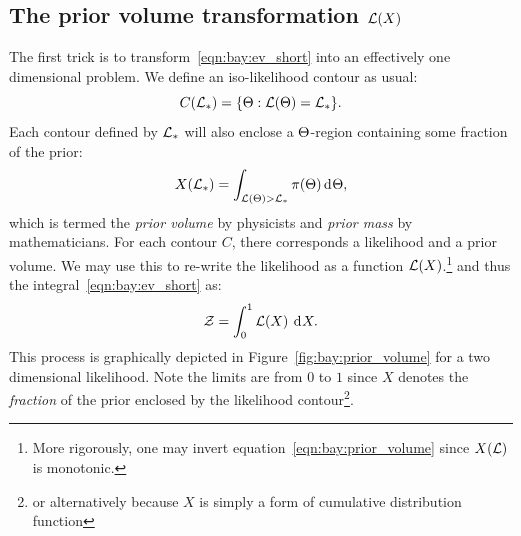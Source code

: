 \subsection{The prior volume transformation $\mathcal{L}(X)$}
The first trick is to transform~\eqref{eqn:bay:ev_short} into an effectively one dimensional problem. We define an iso-likelihood contour as usual:
\begin{equation}
  C(\mathcal{L}_\ast) = \{\Theta : \mathcal{L}(\Theta)=\mathcal{L}_\ast \}.
  \label{eqn:bay:contour_def}
\end{equation}
Each contour defined by $\mathcal{L}_\ast$ will also enclose a $\Theta$-region containing some fraction of the prior:
\begin{equation}
  X(\mathcal{L}_\ast) = \int_{\mathcal{L}(\Theta)>\mathcal{L}_\ast} \pi(\Theta) \operatorname{d}^{}\!{\Theta},
  \label{eqn:bay:prior_volume}
\end{equation}
which is termed the {\em prior volume\/} by physicists and {\em prior mass\/} by mathematicians. For each contour $C$, there corresponds a likelihood and a prior volume. We may use this to re-write the likelihood as a function $\mathcal{L}(X)$.\footnote{More rigorously, one may invert equation~\protect\eqref{eqn:bay:prior_volume} since $X(\mathcal{L})$ is monotonic.} and thus the integral~\eqref{eqn:bay:ev_short} as:
\begin{equation}
  \mathcal{Z} = \int_0^1 \mathcal{L}(X)\:\operatorname{d}^{}\!{X}.
  \label{eqn:bay:ev_X}
\end{equation}
This process is graphically depicted in Figure~\ref{fig:bay:prior_volume} for a two dimensional likelihood. Note the limits are from $0$ to $1$ since $X$ denotes the {\em fraction\/} of the prior enclosed by the likelihood contour\footnote{or alternatively because $X$ is simply a form of cumulative distribution function}.
%
